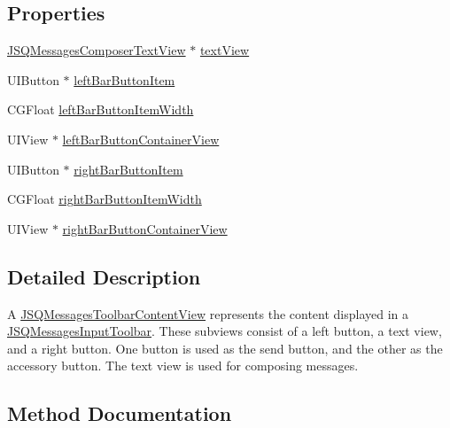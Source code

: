 \subsection*{Properties}
\begin{DoxyCompactItemize}
\item 
\hyperlink{interface_j_s_q_messages_composer_text_view}{J\+S\+Q\+Messages\+Composer\+Text\+View} $\ast$ \hyperlink{interface_j_s_q_messages_toolbar_content_view_aae3a8d9f24e0183c39d001c911150970}{text\+View}
\item 
U\+I\+Button $\ast$ \hyperlink{interface_j_s_q_messages_toolbar_content_view_af737e7cc11b7b83ec439bd5e659cf6a3}{left\+Bar\+Button\+Item}
\item 
C\+G\+Float \hyperlink{interface_j_s_q_messages_toolbar_content_view_a6976e578e487ce676debe6479b4e6f20}{left\+Bar\+Button\+Item\+Width}
\item 
U\+I\+View $\ast$ \hyperlink{interface_j_s_q_messages_toolbar_content_view_a90e3fa0a0808eefe3ffb54f0fe09f22f}{left\+Bar\+Button\+Container\+View}
\item 
U\+I\+Button $\ast$ \hyperlink{interface_j_s_q_messages_toolbar_content_view_a376f245e23e4061f5c3bcc48304c7698}{right\+Bar\+Button\+Item}
\item 
C\+G\+Float \hyperlink{interface_j_s_q_messages_toolbar_content_view_a6b885f81a85a228cf38eaf6087ce7d39}{right\+Bar\+Button\+Item\+Width}
\item 
U\+I\+View $\ast$ \hyperlink{interface_j_s_q_messages_toolbar_content_view_a975f0ae0017e0fe18ba7f75dd12323f3}{right\+Bar\+Button\+Container\+View}
\end{DoxyCompactItemize}


\subsection{Detailed Description}
A {\ttfamily \hyperlink{interface_j_s_q_messages_toolbar_content_view}{J\+S\+Q\+Messages\+Toolbar\+Content\+View}} represents the content displayed in a {\ttfamily \hyperlink{interface_j_s_q_messages_input_toolbar}{J\+S\+Q\+Messages\+Input\+Toolbar}}. These subviews consist of a left button, a text view, and a right button. One button is used as the send button, and the other as the accessory button. The text view is used for composing messages. 

\subsection{Method Documentation}
\hypertarget{interface_j_s_q_messages_toolbar_content_view_a5cffcd9a89b4822dfb45a336fb0b09d6}{}
